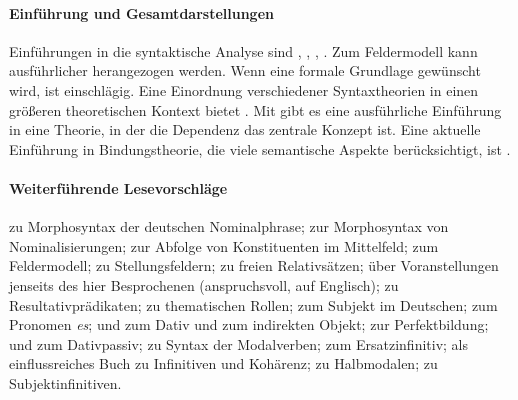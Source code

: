 \begin{sloppypar}

\paragraph*{Einführung und Gesamtdarstellungen}

Einführungen in die syntaktische Analyse sind \zB \citet{Duerscheid2012}, \citet{WoellsteinEa1997}, \citet{Eroms2000}, \citet{Musan2009}.
Zum Feldermodell kann ausführlicher \citet{Woellstein2010} herangezogen werden.
Wenn eine formale Grundlage gewünscht wird, ist \citet{Mueller08} einschlägig.
Eine Einordnung verschiedener Syntaxtheorien in einen größeren theoretischen Kontext bietet \citet{Mueller10}.
Mit \citet{Engel09} gibt es eine ausführliche Einführung in eine Theorie, in der die Dependenz das zentrale Konzept ist.
Eine aktuelle Einführung in Bindungstheorie, die viele semantische Aspekte berücksichtigt, ist \citet{Buering2005}.

\paragraph*{Weiterführende Lesevorschläge}
\citet{Gallmann1996} zu Morphosyntax der deutschen Nominalphrase;
\citet{Fabricius1993} zur Morphosyntax von Nominalisierungen;
\citet{Loetscher1981} zur Abfolge von Konstituenten im Mittelfeld;
\citet{Hoehle1986} zum Feldermodell;
\citet{Askedal1986} zu Stellungsfeldern;
\citet{Pittner2003} zu freien Relativsätzen;
\citet{DekuthyMeurers2001} über Voranstellungen jenseits des hier Besprochenen (anspruchsvoll, auf Englisch);
\citet{Richter2002} zu Resultativprädikaten;
\citet{Dowty91} zu thematischen Rollen;
\citet{Reis1982} zum Subjekt im Deutschen;
\citet{Askedal1990} zum Pronomen \textit{es};
\citet{Wegener1986} und \citet{Wegener1991} zum Dativ und zum indirekten Objekt;
\citet{Musan1999} zur Perfektbildung;
\citet{HentschelWeydt1995} und \citet{Leirbukt2013} zum Dativpassiv;
\citet{Reis2001} zu Syntax der Modalverben;
\citet{Askedal1991} zum Ersatzinfinitiv;
\citet{Bech1983} als einflussreiches Buch zu Infinitiven und Kohärenz;
\citet{Reis2005} zu Halbmodalen;
\citet{Askedal1988} zu Subjektinfinitiven.

\end{sloppypar}
